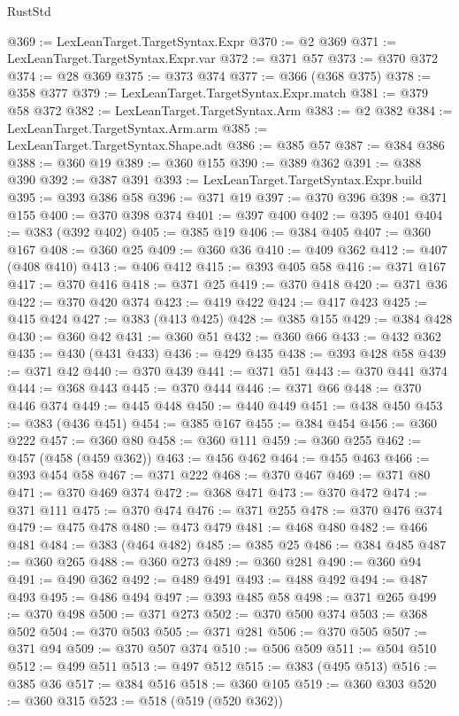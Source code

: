 \begin{lexlean}{RustStd}
\begin{coremodule}
{\begin{coremodule}
{{{{{{{{{{{{{{{{@369 := LexLeanTarget.TargetSyntax.Expr
@370 := @2 @369
@371 := LexLeanTarget.TargetSyntax.Expr.var
@372 := @371 @57
@373 := @370 @372
@374 := @28 @369
@375 := @373 @374
@377 := @366 (@368 @375)
@378 := @358 @377
@379 := LexLeanTarget.TargetSyntax.Expr.match
@381 := @379 @58 @372
@382 := LexLeanTarget.TargetSyntax.Arm
@383 := @2 @382
@384 := LexLeanTarget.TargetSyntax.Arm.arm
@385 := LexLeanTarget.TargetSyntax.Shape.adt
@386 := @385 @57
@387 := @384 @386
@388 := @360 @19
@389 := @360 @155
@390 := @389 @362
@391 := @388 @390
@392 := @387 @391
@393 := LexLeanTarget.TargetSyntax.Expr.build
@395 := @393 @386 @58
@396 := @371 @19
@397 := @370 @396
@398 := @371 @155
@400 := @370 @398 @374
@401 := @397 @400
@402 := @395 @401
@404 := @383 (@392 @402)
@405 := @385 @19
@406 := @384 @405
@407 := @360 @167
@408 := @360 @25
@409 := @360 @36
@410 := @409 @362
@412 := @407 (@408 @410)
@413 := @406 @412
@415 := @393 @405 @58
@416 := @371 @167
@417 := @370 @416
@418 := @371 @25
@419 := @370 @418
@420 := @371 @36
@422 := @370 @420 @374
@423 := @419 @422
@424 := @417 @423
@425 := @415 @424
@427 := @383 (@413 @425)
@428 := @385 @155
@429 := @384 @428
@430 := @360 @42
@431 := @360 @51
@432 := @360 @66
@433 := @432 @362
@435 := @430 (@431 @433)
@436 := @429 @435
@438 := @393 @428 @58
@439 := @371 @42
@440 := @370 @439
@441 := @371 @51
@443 := @370 @441 @374
@444 := @368 @443
@445 := @370 @444
@446 := @371 @66
@448 := @370 @446 @374
@449 := @445 @448
@450 := @440 @449
@451 := @438 @450
@453 := @383 (@436 @451)
@454 := @385 @167
@455 := @384 @454
@456 := @360 @222
@457 := @360 @80
@458 := @360 @111
@459 := @360 @255
@462 := @457 (@458 (@459 @362))
@463 := @456 @462
@464 := @455 @463
@466 := @393 @454 @58
@467 := @371 @222
@468 := @370 @467
@469 := @371 @80
@471 := @370 @469 @374
@472 := @368 @471
@473 := @370 @472
@474 := @371 @111
@475 := @370 @474
@476 := @371 @255
@478 := @370 @476 @374
@479 := @475 @478
@480 := @473 @479
@481 := @468 @480
@482 := @466 @481
@484 := @383 (@464 @482)
@485 := @385 @25
@486 := @384 @485
@487 := @360 @265
@488 := @360 @273
@489 := @360 @281
@490 := @360 @94
@491 := @490 @362
@492 := @489 @491
@493 := @488 @492
@494 := @487 @493
@495 := @486 @494
@497 := @393 @485 @58
@498 := @371 @265
@499 := @370 @498
@500 := @371 @273
@502 := @370 @500 @374
@503 := @368 @502
@504 := @370 @503
@505 := @371 @281
@506 := @370 @505
@507 := @371 @94
@509 := @370 @507 @374
@510 := @506 @509
@511 := @504 @510
@512 := @499 @511
@513 := @497 @512
@515 := @383 (@495 @513)
@516 := @385 @36
@517 := @384 @516
@518 := @360 @105
@519 := @360 @303
@520 := @360 @315
@523 := @518 (@519 (@520 @362))
}}}}}}}}}}}}}}}}
\end{coremodule}}
\end{coremodule}
\end{lexlean}
